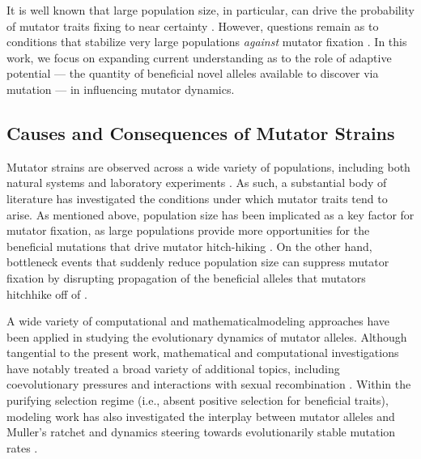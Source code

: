 It is well known that large population size, in particular, can drive the probability of mutator traits fixing to near certainty \citep{raynes2018sign,tenaillon1999mutators,andre2006evolution,good2016evolution}.
However, questions remain as to conditions that stabilize very large populations \textit{against} mutator fixation \citep{raynes2012contrasting,raynes2019migration,tanaka2003evolution}.
In this work, we focus on expanding current understanding as to the role of adaptive potential --- the quantity of beneficial novel alleles available to discover via mutation --- in influencing mutator dynamics.

\subsection{Causes and Consequences of Mutator Strains}

Mutator strains are observed across a wide variety of populations, including both natural systems and laboratory experiments \citep{sniegowski1997evolution,swings2017adaptive,maddamsetti2020divergent,cherry2018methylation,notleymcrobb2002enrichment,shaver2002fitness,voordeckers2015adaptation,leclerc1996high}.
As such, a substantial body of literature has investigated the conditions under which mutator traits tend to arise.
As mentioned above, population size has been implicated as a key factor for mutator fixation, as large populations provide more opportunities for the beneficial mutations that drive mutator hitch-hiking \citep{chao1983competition}.
On the other hand, bottleneck events that suddenly reduce population size can suppress mutator fixation by disrupting propagation of the beneficial alleles that mutators hitchhike off of \citep{raynes2013effect}.

A wide variety of computational and mathematicalmodeling approaches have been applied in studying the evolutionary dynamics of mutator alleles.
Although tangential to the present work, mathematical and computational investigations have notably treated a broad variety of additional topics, including coevolutionary pressures \citep{pal2007coevolution} and interactions with sexual recombination \citep{johnson1999beneficial}.
Within the purifying selection regime (i.e., absent positive selection for beneficial traits), modeling work has also investigated the interplay between mutator alleles and Muller's ratchet \citep{soderberg2011kickstarting} and dynamics steering towards evolutionarily stable mutation rates \citep{lynch2008cellular}.

